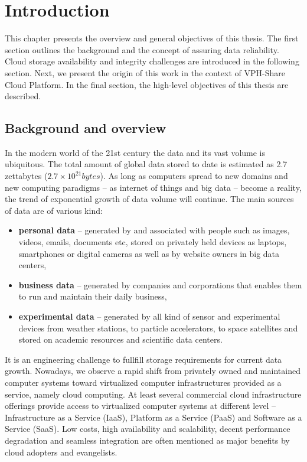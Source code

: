 \chapter{Introduction}
\label{cha:introduction}

This chapter presents the overview and general objectives of this thesis.
The first section outlines the background and the concept of
assuring data reliability. Cloud storage availability and integrity challenges
are introduced in the following section. Next, we present the origin of
this work in the context of VPH-Share Cloud Platform. In the final section,
the high-level objectives of this thesis are described.
 
\section{Background and overview}
In the modern world of the 21st century the data and its vast volume
is ubiquitous. The total amount of global data stored to date is estimated
as 2.7 zettabytes ($2.7 \times 10^{21}bytes$). As long as computers spread to 
new domains and new computing paradigms -- as internet of things and big data
-- become a reality, the trend of exponential growth of data volume
will continue. The main sources of data are of various kind:

\begin{itemize}
\item \textbf{personal data} -- generated by and associated with people such as
images, videos, emails, documents etc, stored on privately held devices as
laptops, smartphones or digital cameras as well as by website owners in
big data centers,
\item \textbf{business data} -- generated by companies and corporations
that enables them to run and maintain their daily business,
\item \textbf{experimental data} -- generated by all kind of sensor and
experimental devices from weather stations, to particle accelerators, to
space satellites and stored on academic resources and scientific data centers.
\end{itemize}

It is an engineering challenge to fullfill storage requirements for current
data growth. Nowadays, we observe a rapid shift from privately owned and maintained
computer systems toward virtualized computer infrastructures provided as a service,
namely cloud computing. At least several commercial cloud infrastructure offerings 
provide access to virtualized computer systems at different level -- Infrastructure
as a Service (IaaS), Platform as a Service (PaaS) and Software as a Service (SaaS).
Low costs, high availability and scalability, decent performance degradation and 
seamless integration are often mentioned as major benefits by cloud adopters and
evangelists.\\

